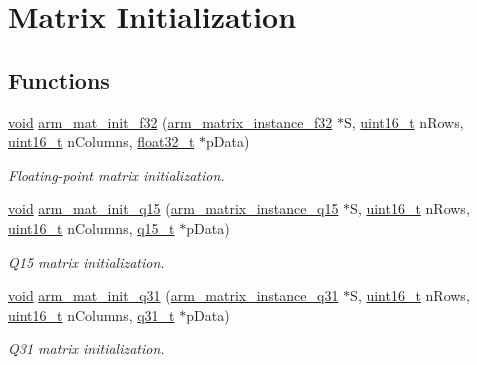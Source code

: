 \hypertarget{group___matrix_init}{\section{Matrix Initialization}
\label{group___matrix_init}
}
\subsection*{Functions}
\begin{DoxyCompactItemize}
\item 
\hyperlink{group___n_a_m_e_ga18028b8badbf1ea7e704ccac3c488e82}{void} \hyperlink{group___matrix_init_ga11e3dc41592a6401c13182fef9416a27}{arm\-\_\-mat\-\_\-init\-\_\-f32} (\hyperlink{structarm__matrix__instance__f32}{arm\-\_\-matrix\-\_\-instance\-\_\-f32} $\ast$S, \hyperlink{stdint_8h_a273cf69d639a59973b6019625df33e30}{uint16\-\_\-t} n\-Rows, \hyperlink{stdint_8h_a273cf69d639a59973b6019625df33e30}{uint16\-\_\-t} n\-Columns, \hyperlink{arm__math_8h_a4611b605e45ab401f02cab15c5e38715}{float32\-\_\-t} $\ast$p\-Data)
\begin{DoxyCompactList}\small\item\em Floating-\/point matrix initialization. \end{DoxyCompactList}\item 
\hyperlink{group___n_a_m_e_ga18028b8badbf1ea7e704ccac3c488e82}{void} \hyperlink{group___matrix_init_ga31a7c2b991803d49719393eb2d53dc26}{arm\-\_\-mat\-\_\-init\-\_\-q15} (\hyperlink{structarm__matrix__instance__q15}{arm\-\_\-matrix\-\_\-instance\-\_\-q15} $\ast$S, \hyperlink{stdint_8h_a273cf69d639a59973b6019625df33e30}{uint16\-\_\-t} n\-Rows, \hyperlink{stdint_8h_a273cf69d639a59973b6019625df33e30}{uint16\-\_\-t} n\-Columns, \hyperlink{arm__math_8h_ab5a8fb21a5b3b983d5f54f31614052ea}{q15\-\_\-t} $\ast$p\-Data)
\begin{DoxyCompactList}\small\item\em Q15 matrix initialization. \end{DoxyCompactList}\item 
\hyperlink{group___n_a_m_e_ga18028b8badbf1ea7e704ccac3c488e82}{void} \hyperlink{group___matrix_init_ga48a5e5d37e1f062cc57fcfaf683343cc}{arm\-\_\-mat\-\_\-init\-\_\-q31} (\hyperlink{structarm__matrix__instance__q31}{arm\-\_\-matrix\-\_\-instance\-\_\-q31} $\ast$S, \hyperlink{stdint_8h_a273cf69d639a59973b6019625df33e30}{uint16\-\_\-t} n\-Rows, \hyperlink{stdint_8h_a273cf69d639a59973b6019625df33e30}{uint16\-\_\-t} n\-Columns, \hyperlink{arm__math_8h_adc89a3547f5324b7b3b95adec3806bc0}{q31\-\_\-t} $\ast$p\-Data)
\begin{DoxyCompactList}\small\item\em Q31 matrix initialization. \end{DoxyCompactList}\end{DoxyCompactItemize}


